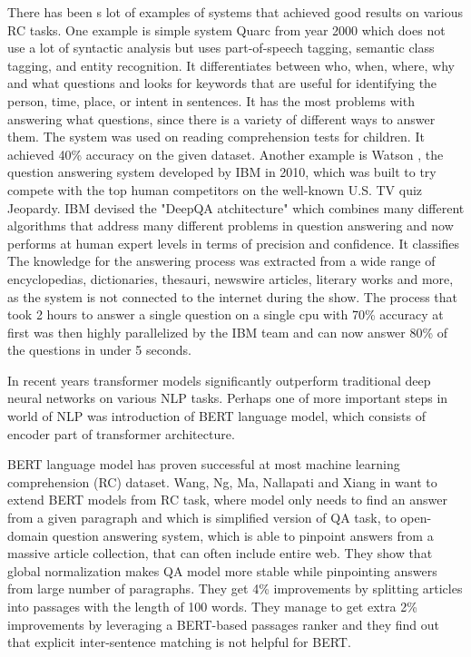 \documentclass[fleqn,moreauthors,10pt]{ds_report}
\begin{document}
There has been s lot of examples of systems that achieved good results on various RC tasks. One example is simple system Quarc \cite{quarc} from year 2000 which does not use a lot of syntactic analysis but uses part-of-speech tagging, semantic class tagging, and entity recognition. It differentiates between who, when, where, why and what questions and looks for keywords that are useful for identifying the person, time, place, or intent in sentences. It has the most problems with answering what questions, since there is a variety of different ways to answer them. The system was used on reading comprehension tests for children. It achieved 40\% accuracy on the given dataset. Another example is Watson \cite{watson}, the question answering system developed by IBM in 2010, which was built to try compete with the top human competitors on the well-known U.S. TV quiz Jeopardy. IBM devised the "DeepQA atchitecture" which combines many different algorithms that address many different problems in question answering and now performs at human expert levels in terms of precision and confidence. It classifies The knowledge for the answering process was extracted from a wide range of encyclopedias, dictionaries, thesauri, newswire articles, literary works and more, as the system is not connected to the internet during the show. The process that took 2 hours to answer a single question on a single cpu with 70\% accuracy at first was then highly parallelized by the IBM team and can now answer 80\% of the questions in under 5 seconds.

In recent years transformer models significantly outperform traditional deep neural networks on various NLP tasks. Perhaps one of more important steps in world of NLP was introduction of BERT language model, which consists of encoder part of transformer architecture. 

BERT language model has proven successful at most machine learning comprehension (RC) dataset. Wang, Ng, Ma, Nallapati and Xiang in \cite{wang2019multi} want to extend BERT models from RC task, where model only needs to find an answer from a given paragraph and which is simplified version of QA task, to open-domain question answering system, which is able to pinpoint answers from a massive article collection, that can often include entire web. They show that global normalization makes QA model more stable while pinpointing answers from large number of paragraphs. They get 4\% improvements by splitting articles into passages with the length of 100 words. They manage to get extra 2\% improvements by leveraging a BERT-based passages ranker and they find out that explicit inter-sentence matching is not helpful for BERT.
\end{document}
